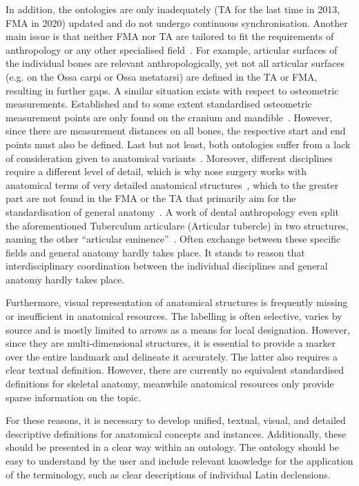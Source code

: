 \documentclass[sw]{iosart2x}
\begin{document}
In addition, the ontologies are only inadequately (TA for the last time in 2013, FMA in 2020) updated and do not undergo continuous synchronisation.%
Another main issue is that neither FMA nor TA are tailored to fit the requirements of anthropology or any other specialised field~\citep{fma}.
For example, articular surfaces of the individual bones are relevant anthropologically, yet not all articular surfaces (e.g. on the Ossa carpi or Ossa metatarsi) are defined in the TA or FMA, resulting in further gaps.
A similar situation exists with respect to osteometric measurements.
Established and to some extent standardised osteometric measurement points are only found on the cranium and mandible~\citep{wesenanthropologie}.
 However, since there are measurement distances on all bones, the respective start and end points must also be defined.
Last but not least, both ontologies suffer from a lack of consideration given to anatomical variants~\citep{anatomycontribution}.
Moreover, different disciplines require a different level of detail, which is why nose surgery works with anatomical terms of very detailed anatomical structures~\citep{graysanatomy},
which to the greater part are not found in the FMA or the TA that primarily aim for the standardisation of general anatomy~\citep{fma}.
A work of dental anthropology even split the aforementioned Tuberculum articulare (Articular tubercle) in two structures, naming the other \enquote{articular eminence}~\citep{dentalanthropology}.
Often exchange between these specific fields and general anatomy hardly takes place.
It stands to reason that interdisciplinary coordination between the individual disciplines and general anatomy hardly takes place.

Furthermore, visual representation of anatomical structures is frequently missing or insufficient in anatomical resources.
The labelling is often selective, varies by source and is mostly limited to arrows as a means for local designation.
However, since they are multi-dimensional structures, it is essential to provide a marker over the entire landmark and delineate it accurately.
The latter also requires a clear textual definition.
 However, there are currently no equivalent standardised definitions for skeletal anatomy, meanwhile anatomical resources only provide sparse information on the topic.

For these reasons, it is necessary to develop unified, textual, visual, and detailed descriptive definitions for anatomical concepts and instances.
Additionally, these should be presented in a clear way within an ontology.
The ontology should be easy to understand by the user and include relevant knowledge for the application of the terminology, such as clear descriptions of individual Latin declensions.
\end{document}
